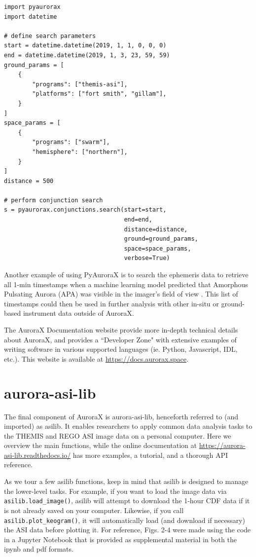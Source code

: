 \documentclass[utf8]{FrontiersinHarvard} %
\begin{document}
\begin{verbatim}
import pyaurorax
import datetime

# define search parameters
start = datetime.datetime(2019, 1, 1, 0, 0, 0)
end = datetime.datetime(2019, 1, 3, 23, 59, 59)
ground_params = [
    {
        "programs": ["themis-asi"],
        "platforms": ["fort smith", "gillam"],
    }
]
space_params = [
    {
        "programs": ["swarm"],
        "hemisphere": ["northern"],
    }
]
distance = 500

# perform conjunction search
s = pyaurorax.conjunctions.search(start=start,
                                  end=end,
                                  distance=distance,
                                  ground=ground_params,
                                  space=space_params,
                                  verbose=True)
\end{verbatim}

Another example of using PyAuroraX is to search the ephemeris data to retrieve all 1-min timestamps when a machine learning model predicted that Amorphous Pulsating Aurora (APA) was visible in the imager's field of view \cite{Grono2020}. This list of timestamps could then be used in further analysis with other in-situ or ground-based instrument data outside of AuroraX.

The AuroraX Documentation website provide more in-depth technical details about AuroraX, and provides a ``Developer Zone" with extensive examples of writing software in various supported languages (ie. Python, Javascript, IDL, etc.). This website is available at \url{https://docs.aurorax.space}.

\section{aurora-asi-lib}\label{aurora-asi-lib}
The final component of AuroraX is aurora-asi-lib, henceforth referred to (and imported) as asilib. It enables researchers to apply common data analysis tasks to the THEMIS and REGO ASI image data on a personal computer. Here we overview the main functions, while the online documentation at \url{https://aurora-asi-lib.readthedocs.io/} has more examples, a tutorial, and a thorough API reference.

As we tour a few asilib functions, keep in mind that asilib is designed to manage the lower-level tasks. For example, if you want to load the image data via \verb|asilib.load_image()|, asilib will attempt to download the 1-hour CDF data if it is not already saved on your computer. Likewise, if you call \verb|asilib.plot_keogram()|, it will automatically load (and download if necessary) the ASI data before plotting it. For reference, Figs. 2-4 were made using the code in a Jupyter Notebook that is provided as supplemental material in both the ipynb and pdf formats.
\end{document}
